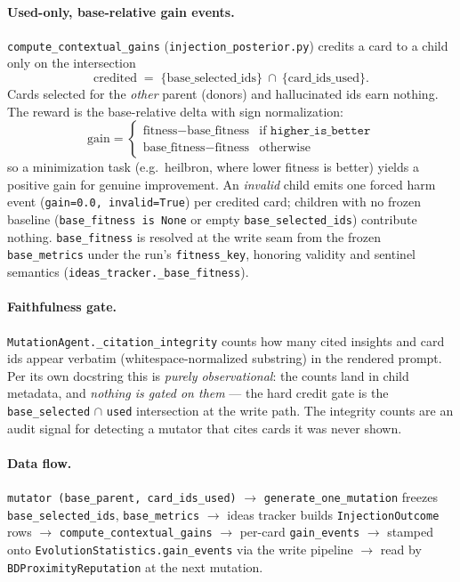 \documentclass[11pt]{article}
\newcommand{\code}[1]{\texttt{#1}}
\begin{document}
\paragraph{Used-only, base-relative gain events.}
\code{compute\_contextual\_gains} (\code{injection\_posterior.py}) credits a card
to a child only on the intersection
\[
\text{credited} \;=\; \{\text{base\_selected\_ids}\} \ \cap\ \{\text{card\_ids\_used}\}.
\]
Cards selected for the \emph{other} parent (donors) and hallucinated ids earn
nothing. The reward is the base-relative delta with sign normalization:
\[
\text{gain} =
\begin{cases}
\text{fitness} - \text{base\_fitness} & \text{if } \texttt{higher\_is\_better}\\
\text{base\_fitness} - \text{fitness} & \text{otherwise}
\end{cases}
\]
so a minimization task (e.g.\ heilbron, where lower fitness is better) yields a
positive gain for genuine improvement. An \emph{invalid} child emits one forced
harm event (\code{gain=0.0, invalid=True}) per credited card; children with no
frozen baseline (\code{base\_fitness is None} or empty \code{base\_selected\_ids})
contribute nothing. \code{base\_fitness} is resolved at the write seam from the
frozen \code{base\_metrics} under the run's \code{fitness\_key}, honoring validity
and sentinel semantics (\code{ideas\_tracker.\_base\_fitness}).

\paragraph{Faithfulness gate.} \code{MutationAgent.\_citation\_integrity} counts
how many cited insights and card ids appear verbatim (whitespace-normalized
substring) in the rendered prompt. Per its own docstring this is \emph{purely
observational}: the counts land in child metadata, and \emph{nothing is gated on
them} --- the hard credit gate is the \code{base\_selected} $\cap$ \code{used}
intersection at the write path. The integrity counts are an audit signal for
detecting a mutator that cites cards it was never shown.

\paragraph{Data flow.} \code{mutator (base\_parent, card\_ids\_used)}
$\to$ \code{generate\_one\_mutation} freezes \code{base\_selected\_ids},
\code{base\_metrics} $\to$ ideas tracker builds \code{InjectionOutcome} rows
$\to$ \code{compute\_contextual\_gains} $\to$ per-card \code{gain\_events}
$\to$ stamped onto \code{EvolutionStatistics.gain\_events} via the write pipeline
$\to$ read by \code{BDProximityReputation} at the next mutation.
\end{document}
